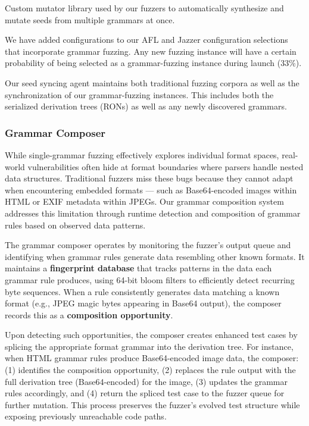 \newpar{\revolver} Custom mutator library used by our fuzzers to automatically synthesize and mutate seeds from multiple grammars at once.

 We have added configurations to our AFL and Jazzer configuration selections that incorporate grammar fuzzing. Any new fuzzing instance will have a certain probability of being selected as a grammar-fuzzing instance during launch (33\%).


\newpar{\seedsync} Our seed syncing agent maintains both traditional fuzzing corpora as well as the synchronization of our grammar-fuzzing instances. This includes both the serialized derivation trees (RONs) as well as any newly discovered grammars.


\subsubsection{Grammar Composer}

While single-grammar fuzzing effectively explores individual format spaces, real-world vulnerabilities often hide at format boundaries where parsers handle nested data structures.
Traditional fuzzers miss these bugs because they cannot adapt when encountering embedded formats --- such as Base64-encoded images within HTML or EXIF metadata within JPEGs.
Our grammar composition system addresses this limitation through runtime detection and composition of grammar rules based on observed data patterns.

The grammar composer operates by monitoring the fuzzer's output queue and identifying when grammar rules generate data resembling other known formats.
It maintains a \textbf{fingerprint database} that tracks patterns in the data each grammar rule produces, using 64-bit bloom filters to efficiently detect recurring byte sequences.
When a rule consistently generates data matching a known format (e.g., JPEG magic bytes appearing in Base64 output), the composer records this as a \textbf{composition opportunity}.

Upon detecting such opportunities, the composer creates enhanced test cases by splicing the appropriate format grammar into the derivation tree.
For instance, when HTML grammar rules produce Base64-encoded image data, the composer: (1) identifies the composition opportunity, (2) replaces the rule output with the full derivation tree (Base64-encoded) for the image, (3) updates the grammar rules accordingly, and (4) return the spliced test case to the fuzzer queue for further mutation.
This process preserves the fuzzer's evolved test structure while exposing previously unreachable code paths.

